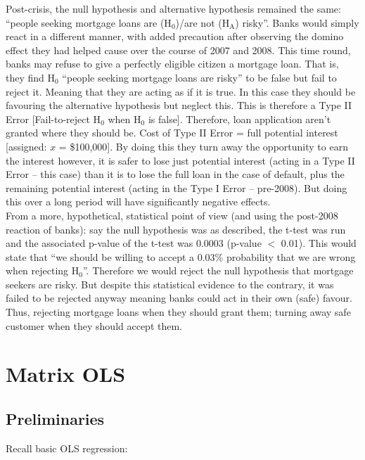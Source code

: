 \documentclass[11pt, english]{article}
\begin{document}
	Post-crisis, the null hypothesis and alternative hypothesis remained the same: ``people seeking mortgage loans are (H$_0$)/are not (H$\mathrm{_A}$) risky''. Banks would simply react in a different manner, with added precaution after observing the domino effect they had helped cause over the course of 2007 and 2008. This time round, banks may refuse to give a perfectly eligible citizen a mortgage loan. That is, they find H$_0$ ``people seeking mortgage loans are risky'' to be false but fail to reject it. Meaning that they are acting as if it is true. In this case they should be favouring the alternative hypothesis but neglect this. This is therefore a Type II Error [Fail-to-reject H$_0$ when H$_0$ is false]. Therefore, loan application aren't granted where they should be. Cost of Type II Error = full potential interest [assigned: $x$ = \$100,000]. By doing this they turn away the opportunity to earn the interest however, it is safer to lose just potential interest (acting in a Type II Error – this case) than it is to lose the full loan in the case of default, plus the remaining potential interest (acting in the Type I Error – pre-2008). But doing this over a long period will have significantly negative effects.\\

	From a more, hypothetical, statistical point of view (and using the post-2008 reaction of banks): say the null hypothesis was as described, the t-test was run and the associated p-value of the t-test was 0.0003 (p-value $<$ 0.01). This would state that ``we should be willing to accept a 0.03\% probability that we are wrong when rejecting H$_0$''. Therefore we would reject the null hypothesis that mortgage seekers are risky. But despite this statistical evidence to the contrary, it was failed to be rejected anyway meaning banks could act in their own (safe) favour. Thus, rejecting mortgage loans when they should grant them; turning away safe customer when they should accept them.

\newpage

\section{Matrix OLS}

	\subsection{Preliminaries}

	Recall basic OLS regression:
\end{document}
